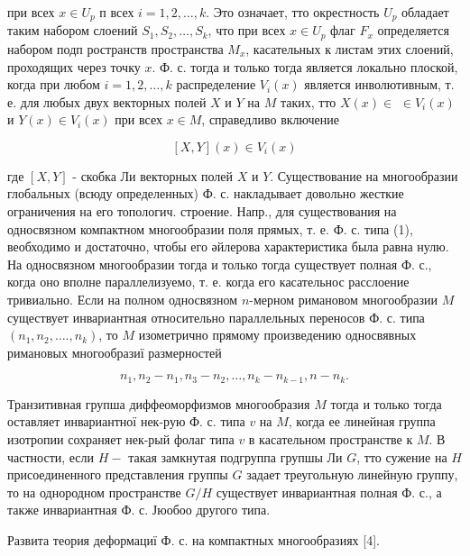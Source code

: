\documentclass[10pt]{article}
\begin{document}
при всех $x \in U_{p}$ п всех $i=1,2, \ldots, k$. Это означает, тто окрестность $U_{p}$ обладает таким набором слоений $S_{1}, S_{2}, \ldots, S_{k}$, что при всех $x \in U_{p}$ флаг $F_{x}$ определяется набором подп ространств пространства $M_{x}$, касательных к листам этих слоений, проходящих через точку $x$. Ф. с. тогда и только тогда является локально плоской, когда при любом $i=1,2, \ldots, k$ распределение $V_{i}(x)$ является инволютивным, т. е. для любых двух векторных полей $X$ и $Y$ на $M$ таких, тто $X(x) \in$ $\in V_{i}(x)$ и $Y(x) \in V_{i}(x)$ при всех $x \in M$, справедливо включение



\[

[X, Y](x) \in V_{i}(x)

\]



где $[X, Y]$ - скобка Ли векторных полей $X$ и $Y$. Существование на многообразии глобальных (всюду определенных) Ф. с. накладывает довольно жесткие ограничения на его топологич. строение. Напр., для существования на односвязном компактном многообразии поля прямых, т. е. Ф. с. типа (1), веобходимо и достаточно, чтобы его әйлерова характеристика была равна нулю. На односвязном многообразии тогда и только тогда существует полная Ф. с., когда оно вполне параллелизуемо, т. е. когда его касательнос расслоение тривиально. Если на полном односвязном $n$-мерном римановом многообразии $M$ существует инвариантная относительно параллельных переносов Ф. с. типа $\left(n_{1}, n_{2}, \ldots ., n_{k}\right)$, то $M$ изометрично прямому произведению односвявных римановых многообразиї размерностей



\[

n_{1}, n_{2}-n_{1}, n_{3}-n_{2}, \ldots, n_{k}-n_{k-1}, n-n_{k} .

\]



Транзитивная групша диффеоморфизмов многообразия $M$ тогда и только тогда оставляет инвариантної нек-рую Ф. с. типа $v$ на $M$, когда ее линейная группа изотропии сохраняет нек-рый фолаг типа $v$ в касательном пространстве к $M$. В частности, если $H-$ такая замкнутая подгруппа групшы Ли $G$, тто сужение на $H$ присоединенного представления группы $G$ задает треугольную линейную группу, то на однородном пространстве $G / H$ существует инвариантная полная Ф. с., а также инвариантная Ф. с. Јюобоо другого типа.



Развита теория деформациї Ф. с. на компактных многообразиях [4].
\end{document}
